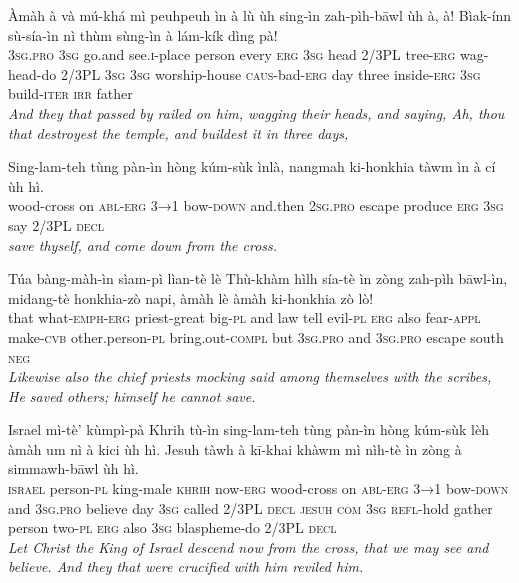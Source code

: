 \documentclass[11pt,a4paper]{article}
\begin{document}
\begin{exe}
\gll Àmàh à và mú-khá mì peuhpeuh ìn à lù ùh sing-ìn zah-pìh-bāwl ùh à, à! Bìak-ínn sù-sía-ìn nì thùm sùng-ìn à lám-kík dìng pà! \\
     \textsc{3sg}.\textsc{pro} \textsc{3sg} go.and see.\textsc{i}-place person every \textsc{erg} \textsc{3sg} head 2/3PL tree-\textsc{erg} wag-head-do 2/3PL \textsc{3sg} \textsc{3sg} worship-house \textsc{caus}-bad-\textsc{erg} day three inside-\textsc{erg} \textsc{3sg} build-\textsc{iter} \textsc{irr} father \\
\glt \textcolor{kjvcolor}{\textit{And they that passed by railed on him, wagging their heads, and saying, Ah, thou that destroyest the temple, and buildest it in three days,}}

\gll Sing-lam-teh tùng pàn-ìn hòng kúm-sùk ìnlà, nangmah ki-honkhia tàwm ìn à cí ùh hì. \\
     wood-cross on \textsc{abl}-\textsc{erg} \textsc{3→1} bow-\textsc{down} and.then \textsc{2sg}.\textsc{pro} escape produce \textsc{erg} \textsc{3sg} say 2/3PL \textsc{decl} \\
\glt \textcolor{kjvcolor}{\textit{save thyself, and come down from the cross.}}

\gll Túa bàng-màh-ìn sìam-pì lìan-tè lè Thù-khàm hìlh sía-tè ìn zòng zah-pìh bāwl-ìn, midang-tè honkhia-zò napi, àmàh lè àmàh ki-honkhia zò lò! \\
     that what-\textsc{emph}-\textsc{erg} priest-great big-\textsc{pl} and law tell evil-\textsc{pl} \textsc{erg} also fear-\textsc{appl} make-\textsc{cvb} other.person-\textsc{pl} bring.out-\textsc{compl} but \textsc{3sg}.\textsc{pro} and \textsc{3sg}.\textsc{pro} escape south \textsc{neg} \\
\glt \textcolor{kjvcolor}{\textit{Likewise also the chief priests mocking said among themselves with the scribes, He saved others; himself he cannot save.}}

\gll Israel mì-tè' kùmpì-pà Khrih tù-ìn sing-lam-teh tùng pàn-ìn hòng kúm-sùk lèh àmàh um nì à kici ùh hì. Jesuh tàwh à kī-khai khàwm mì nìh-tè ìn zòng à simmawh-bāwl ùh hì. \\
     \textsc{israel} person-\textsc{pl} king-male \textsc{khrih} now-\textsc{erg} wood-cross on \textsc{abl}-\textsc{erg} \textsc{3→1} bow-\textsc{down} and \textsc{3sg}.\textsc{pro} believe day \textsc{3sg} called 2/3PL \textsc{decl} \textsc{jesuh} \textsc{com} \textsc{3sg} \textsc{refl}-hold gather person two-\textsc{pl} \textsc{erg} also \textsc{3sg} blaspheme-do 2/3PL \textsc{decl} \\
\glt \textcolor{kjvcolor}{\textit{Let Christ the King of Israel descend now from the cross, that we may see and believe. And they that were crucified with him reviled him.}}


\end{exe}
\end{document}
